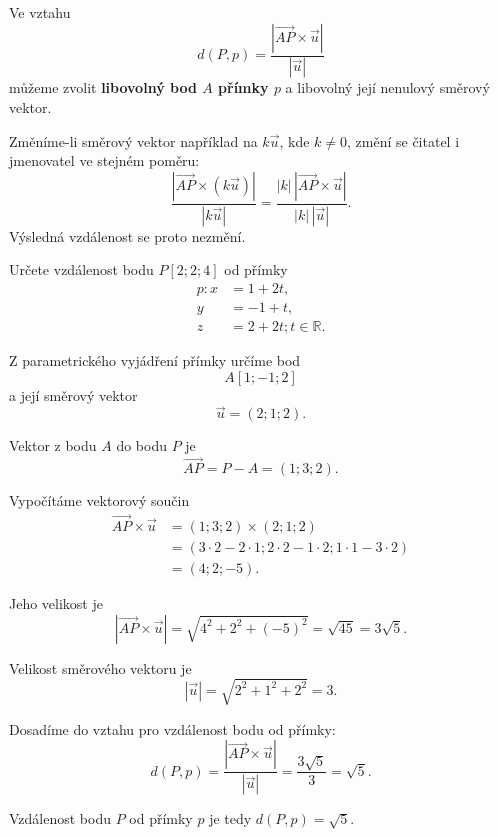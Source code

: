 \begin{remark}
    \label{rem:Choice_point_direction_distance_line}
    Ve vztahu
    \[
        d(P,p)
        =
        \frac{
            |\overrightarrow{AP}\times\vec{u}|
        }{
            |\vec{u}|
        }
    \]
    můžeme zvolit \textbf{libovolný bod $A$ přímky $p$} a libovolný
    její nenulový směrový vektor.

    Změníme-li směrový vektor například na $k\vec{u}$, kde $k\neq0$,
    změní se čitatel i jmenovatel ve stejném poměru:
    \[
        \frac{
            |\overrightarrow{AP}\times(k\vec{u})|
        }{
            |k\vec{u}|
        }
        =
        \frac{
            |k|\,
            |\overrightarrow{AP}\times\vec{u}|
        }{
            |k|\,|\vec{u}|
        }.
    \]
    Výsledná vzdálenost se proto nezmění.
\end{remark}

\begin{example}
    \label{exa:Distance_point_parametric_line_space}

    Určete vzdálenost bodu $P[2;2;4]$ od přímky
    \[
        \begin{aligned}
            p:  x&=1+2t,\\
                y&=-1+t,\\
                z&=2+2t; t\in\mathbb{R}.
        \end{aligned}
    \]

    Z parametrického vyjádření přímky určíme bod
    \[
        A[1;-1;2]
    \]
    a její směrový vektor
    \[
        \vec{u}=(2;1;2).
    \]

    Vektor z bodu $A$ do bodu $P$ je
    \[
        \overrightarrow{AP}
        =
        P-A
        =
        (1;3;2).
    \]

    Vypočítáme vektorový součin
    \begin{align*}
        \overrightarrow{AP}\times\vec{u}
        &=
        (1;3;2)\times(2;1;2)\\
        &=
        \left(
            3\cdot2-2\cdot1;
            2\cdot2-1\cdot2;
            1\cdot1-3\cdot2
        \right)\\
        &=
        (4;2;-5).
    \end{align*}

    Jeho velikost je
    \[
        \left|
            \overrightarrow{AP}\times\vec{u}
        \right|
        =
        \sqrt{4^2+2^2+(-5)^2}
        =
        \sqrt{45}
        =
        3\sqrt5.
    \]

    Velikost směrového vektoru je
    \[
        |\vec{u}|
        =
        \sqrt{2^2+1^2+2^2}
        =
        3.
    \]

    Dosadíme do vztahu pro vzdálenost bodu od přímky:
    \[
        d(P,p)
        =
        \frac{
            |\overrightarrow{AP}\times\vec{u}|
        }{
            |\vec{u}|
        }
        =
        \frac{3\sqrt5}{3}
        =
        \sqrt5.
    \]

    Vzdálenost bodu $P$ od přímky $p$ je tedy $d(P,p)=\sqrt{5}$.
\end{example}

